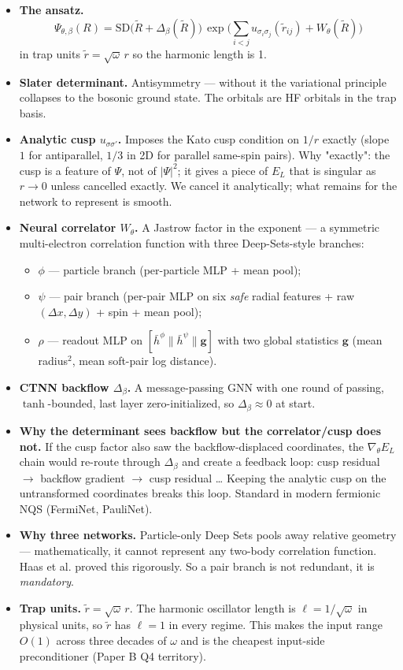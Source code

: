 \documentclass[11pt]{article}
\begin{document}
\begin{itemize}
\item \textbf{The ansatz.}
\[\Psi_{\theta,\beta}(R) = \mathrm{SD}\bigl(\tilde R + \Delta_\beta(\tilde
  R)\bigr) \, \exp\!\Big(\sum_{i<j} u_{\sigma_i\sigma_j}(\tilde r_{ij}) +
  W_\theta(\tilde R)\Big)\]
in trap units $\tilde r = \sqrt\omega \, r$ so the harmonic length is 1.
\item \textbf{Slater determinant.} Antisymmetry --- without it the variational principle
collapses to the bosonic ground state. The orbitals are HF orbitals in the
trap basis.
\item \textbf{Analytic cusp $u_{\sigma\sigma'}$.} Imposes the Kato cusp condition
on $1/r$ exactly (slope $1$ for antiparallel, $1/3$ in 2D for parallel
same-spin pairs). Why "exactly": the cusp is a feature of $\Psi$, not of
$|\Psi|^2$; it gives a piece of $E_L$ that is singular as $r\to 0$ unless
cancelled exactly. We cancel it analytically; what remains for the network
to represent is smooth.
\item \textbf{Neural correlator $W_\theta$.} A Jastrow factor in the exponent --- a
symmetric multi-electron correlation function with three Deep-Sets-style
branches:
\begin{itemize}
\item $\phi$ --- particle branch (per-particle MLP + mean pool);
\item $\psi$ --- pair branch (per-pair MLP on six \emph{safe} radial features + raw
$(\Delta x, \Delta y)$ + spin + mean pool);
\item $\rho$ --- readout MLP on $[\bar h^\phi \| \bar h^\psi \| \mathbf g]$ with
two global statistics $\mathbf g$ (mean radius$^{2}$, mean soft-pair log
distance).
\end{itemize}
\item \textbf{CTNN backflow $\Delta_\beta$.} A message-passing GNN with one round of
passing, $\tanh$-bounded, last layer zero-initialized, so $\Delta_\beta
  \approx 0$ at start.
\item \textbf{Why the determinant sees backflow but the correlator/cusp does not.}
If the cusp factor also saw the backflow-displaced coordinates, the
$\nabla_\theta E_L$ chain would re-route through $\Delta_\beta$ and create
a feedback loop: cusp residual $\to$ backflow gradient $\to$ cusp residual \ldots{}
Keeping the analytic cusp on the untransformed coordinates breaks this
loop. Standard in modern fermionic NQS (FermiNet, PauliNet).
\item \textbf{Why three networks.} Particle-only Deep Sets pools away relative
geometry --- mathematically, it cannot represent any two-body correlation
function. Haas et al. proved this rigorously. So a pair branch is not
redundant, it is \emph{mandatory}.
\item \textbf{Trap units.} $\tilde r = \sqrt\omega \, r$. The harmonic oscillator
length is $\ell = 1/\sqrt\omega$ in physical units, so $\tilde r$ has
$\ell = 1$ in every regime. This makes the input range $O(1)$ across three
decades of $\omega$ and is the cheapest input-side preconditioner (Paper B
Q4 territory).
\end{itemize}
\end{document}
